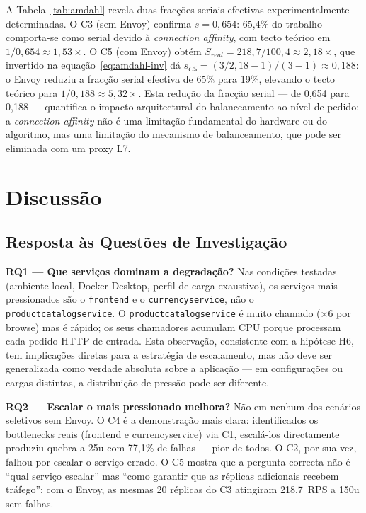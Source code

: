 \documentclass[acmsmall,screen=true,nonacm]{acmart}
\begin{document}
A Tabela~\ref{tab:amdahl} revela duas fracções seriais efectivas experimentalmente determinadas. O C3 (sem Envoy) confirma $s=0{,}654$: 65,4\% do trabalho comporta-se como serial devido à \textit{connection affinity}, com tecto teórico em $1/0{,}654 \approx 1{,}53\times$. O C5 (com Envoy) obtém $S_{real}=218{,}7/100{,}4\approx 2{,}18\times$, que invertido na equação~\ref{eq:amdahl-inv} dá $s_{C5}=(3/2{,}18-1)/(3-1)\approx 0{,}188$: o Envoy reduziu a fracção serial efectiva de 65\% para 19\%, elevando o tecto teórico para $1/0{,}188\approx 5{,}32\times$. Esta redução da fracção serial — de 0,654 para 0,188 — quantifica o impacto arquitectural do balanceamento ao nível de pedido: a \textit{connection affinity} não é uma limitação fundamental do hardware ou do algoritmo, mas uma limitação do mecanismo de balanceamento, que pode ser eliminada com um proxy L7.

\section{Discussão}
\label{sec:discussao}

\subsection{Resposta às Questões de Investigação}

\textbf{RQ1 — Que serviços dominam a degradação?} Nas condições testadas (ambiente local, Docker Desktop, perfil de carga exaustivo), os serviços mais pressionados são o \texttt{frontend} e o \texttt{currencyservice}, não o \texttt{productcatalogservice}. O \texttt{productcatalogservice} é muito chamado (×6 por browse) mas é rápido; os seus chamadores acumulam CPU porque processam cada pedido HTTP de entrada. Esta observação, consistente com a hipótese H6, tem implicações diretas para a estratégia de escalamento, mas não deve ser generalizada como verdade absoluta sobre a aplicação — em configurações ou cargas distintas, a distribuição de pressão pode ser diferente.

\textbf{RQ2 — Escalar o mais pressionado melhora?} Não em nenhum dos cenários seletivos sem Envoy. O C4 é a demonstração mais clara: identificados os bottlenecks reais (frontend e currencyservice) via C1, escalá-los directamente produziu quebra a 25u com 77,1\% de falhas — pior de todos. O C2, por sua vez, falhou por escalar o serviço errado. O C5 mostra que a pergunta correcta não é ``qual serviço escalar'' mas ``como garantir que as réplicas adicionais recebem tráfego'': com o Envoy, as mesmas 20 réplicas do C3 atingiram 218,7~RPS a 150u sem falhas.
\end{document}

